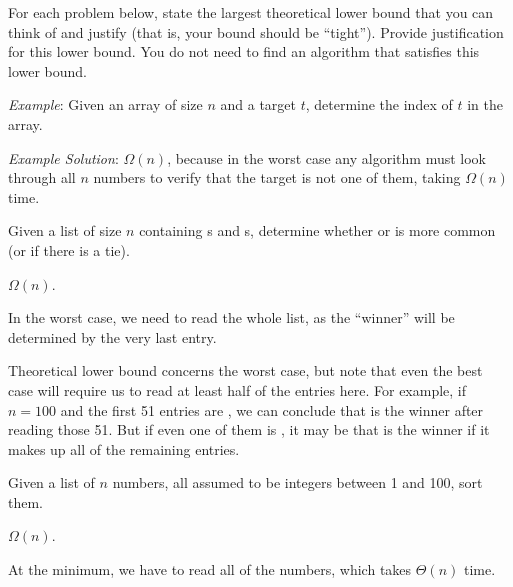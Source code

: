 \begin{prob}
    For each problem below, state the largest theoretical lower bound that you can think
    of and justify (that is, your bound should be ``tight'').
    Provide justification for this lower bound. You do not need to find an algorithm
    that satisfies this lower bound.

    \emph{Example}: Given an array of size $n$ and a target $t$, determine the index of $t$ in the array.

    \emph{Example Solution}: $\Omega(n)$, because in the worst case any
    algorithm must look through all $n$ numbers to verify that the target is
    not one of them, taking $\Omega(n)$ time.

    \begin{subprobset}

        \begin{subprob}
            Given a list of size $n$ containing s and s, determine whether  or
             is more common (or if there is a tie).

            \begin{soln}
                $\Omega(n)$.

                In the worst case, we need to read the whole list, as the ``winner'' will be determined by the very last entry.

                Theoretical lower bound concerns the worst case, but note that even the best case will require us to read at least
                half of the entries here. For example, if $n = 100$ and the first 51 entries are , we can conclude that
                 is the winner after reading those 51. But if even one of them is , it may be that
                 is the winner if it makes up all of the remaining entries.
            \end{soln}

        \end{subprob}

        \begin{subprob}
            Given a list of $n$ numbers, all assumed to be integers between 1 and 100, sort them.

            \begin{soln}
                $\Omega(n)$.

                At the minimum, we have to read all of the numbers, which takes $\Theta(n)$ time.


\end{soln}
\end{subprob}
\end{subprobset}
\end{prob}
